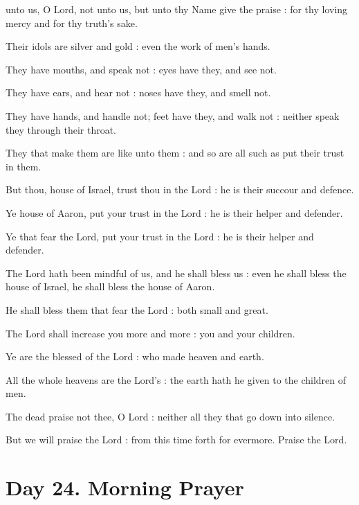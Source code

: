  unto us, O Lord, not unto us, but unto thy Name give the praise : for thy loving mercy and for thy truth's sake.\par
{}
Their idols are silver and gold : even the work of men's hands.\par
{}They have mouths, and speak not : eyes have they, and see not.\par
{}They have ears, and hear not : noses have they, and smell not.\par
{}They have hands, and handle not; feet have they, and walk not : neither speak they through their throat.\par
{}They that make them are like unto them : and so are all such as put their trust in them.\par
{}But thou, house of Israel, trust thou in the Lord : he is their succour and defence.\par
{}Ye house of Aaron, put your trust in the Lord : he is their helper and defender.\par
{}Ye that fear the Lord, put your trust in the Lord : he is their helper and defender.\par
{}The Lord hath been mindful of us, and he shall bless us : even he shall bless the house of Israel, he shall bless the house of Aaron.\par
{}He shall bless them that fear the Lord : both small and great.\par
{}The Lord shall increase you more and more : you and your children.\par
{}Ye are the blessed of the Lord : who made heaven and earth.\par
{}All the whole heavens are the Lord's : the earth hath he given to the children of men.\par
{}The dead praise not thee, O Lord : neither all they that go down into silence.\par
{}But we will praise the Lord : from this time forth for evermore. Praise the Lord.\par

\section*{Day 24. Morning Prayer}

